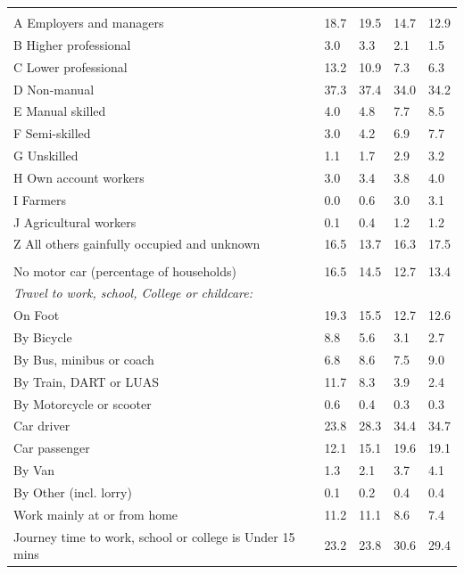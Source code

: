 \documentclass{article}
\begin{document}
\begin{table}[h]
\begin{tabular}{KTTTT}
\hline
    \\ 
    \hline
A Employers and managers & 18.7& 19.5& 14.7& 12.9\\
B Higher professional & 3.0& 3.3& 2.1& 1.5\\
C Lower professional & 13.2& 10.9&  7.3&  6.3\\
D Non-manual & 37.3& 37.4& 34.0& 34.2\\
E Manual skilled & 4.0& 4.8& 7.7& 8.5\\
F Semi-skilled & 3.0& 4.2& 6.9& 7.7\\
G Unskilled & 1.1& 1.7& 2.9& 3.2\\
H Own account workers & 3.0& 3.4& 3.8& 4.0\\
I Farmers & 0.0& 0.6& 3.0& 3.1\\
J Agricultural workers & 0.1& 0.4& 1.2& 1.2\\
Z All others gainfully occupied and unknown & 16.5& 13.7& 16.3& 17.5\\
\hline
{}\hline
    \\ 
    \hline
No motor car (percentage of households) & 16.5& 14.5& 12.7& 
13.4\\
    \hline 
\emph{Travel to work, school, College or childcare:} & & & \\
\quad On Foot & 19.3& 15.5& 12.7& 12.6\\ 
\quad By Bicycle & 8.8& 5.6& 3.1& 2.7\\ 
\quad By Bus, minibus or coach & 6.8& 8.6& 7.5& 9.0\\
\quad By Train, DART or LUAS & 11.7&  8.3&  3.9&  2.4\\
\quad By Motorcycle or scooter & 0.6& 0.4& 0.3& 0.3\\
\quad Car driver & 23.8 & 28.3& 34.4& 34.7\\
\quad Car passenger & 12.1& 15.1& 19.6& 19.1\\
\quad By Van & 1.3& 2.1& 3.7& 4.1\\
\quad By Other (incl. lorry) & 0.1& 0.2& 0.4& 0.4\\
    \hline
Work mainly at or from home & 11.2& 11.1&  8.6&  7.4\\
Journey time to work, school or college is Under 15 mins & 23.2& 23.8& 30.6& 29.4\\

\end{tabular}
\end{table}
\end{document}
